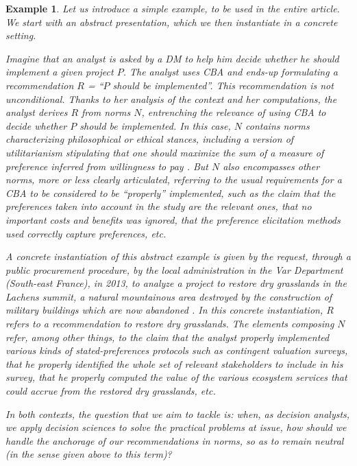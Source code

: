 \documentclass[preprint, french, english, 11pt, authoryear]{elsarticle}%
\newtheorem{example}{Example}
\begin{document}
\begin{example}
Let us introduce a simple example, to be used in the entire article. %
We start with an abstract presentation, which we then instantiate in a concrete setting.

Imagine that an analyst is asked by a \ac{DM} to help him decide whether he should implement a given project $P$.
The analyst uses \ac{CBA} \citep{layard_cost-benefit_1994} and ends-up formulating a recommendation $R$ = “$P$ should be implemented”.
This recommendation is not unconditional.
Thanks to her analysis of the context and her computations, the analyst derives $R$ from norms $N$, entrenching the relevance of using \ac{CBA} to decide whether $P$ should be implemented.
In this case, $N$ contains norms characterizing philosophical or ethical stances, including a version of utilitarianism stipulating that one should maximize the sum of a measure of preference inferred from willingness to pay \citep{meinard_ethical_2016}. 
But $N$ also encompasses other norms, more or less clearly articulated, referring to the usual requirements for a \ac{CBA} to be considered to be ``properly'' implemented, such as the claim that the preferences taken into account in the study are the relevant ones,
that no important costs and benefits was ignored, that the preference elicitation methods used correctly capture preferences, etc.

A concrete instantiation of this abstract example is given by the request, through a public procurement procedure, by the local administration in the Var Department (South-east France), in 2013, to analyze a project to restore dry grasslands in the Lachens summit, 
a natural mountainous area destroyed by the construction of military buildings which are now abandoned \citep{meinard_etude_2015}.
In this concrete instantiation, $R$ refers to a recommendation to restore dry grasslands. 
The elements composing $N$ refer, among other things, to the claim that the analyst properly implemented various kinds of stated-preferences protocols such as contingent valuation surveys, 
that he properly identified the whole set of relevant stakeholders to include in his survey, that he properly computed the value of the various ecosystem services that could accrue from the restored dry grasslands, etc.

In both contexts, the question that we aim to tackle is: when, as decision analysts, we apply decision sciences to solve the practical problems at issue, how should we handle the anchorage of our recommendations in norms, so as to remain neutral (in the sense given above to this term)?
\end{example}
\end{document}
